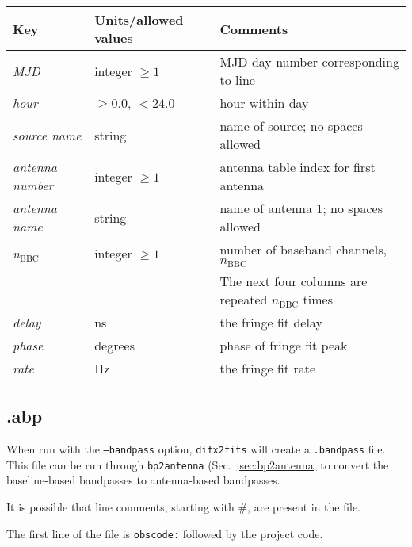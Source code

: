\begin{center}
\begin{tabular}{l l l}
\hline
Key & Units/allowed values & Comments \\
\hline
{\it MJD}            & integer $\ge 1$    & MJD day number corresponding to line \\
{\it hour}           & $\ge 0.0$, $< 24.0$ & hour within day \\
{\it source name}    & string             & name of source; no spaces allowed \\
{\it antenna number} & integer $\ge 1$    & antenna table index for first antenna \\
{\it antenna name}   & string             & name of antenna 1; no spaces allowed \\
{\it n}$_{\mathrm{BBC}}$  & integer $\ge 1$    & number of baseband channels, $n_{\mathrm{BBC}}$ \\
& & The next four columns are repeated $n_{\mathrm{BBC}}$ times \\
\hline
{\it delay}         & ns                 & the fringe fit delay \\
{\it phase}         & degrees            & phase of fringe fit peak \\
{\it rate}          & Hz                 & the fringe fit rate \\
\hline
\end{tabular}
\end{center}






\subsection{.abp} \label{sec:abp}

When run with the {\tt --bandpass} option, {\tt difx2fits} will create a {\tt .bandpass} file.
This file can be run through {\tt bp2antenna} (Sec.~\ref{sec:bp2antenna} to convert the baseline-based bandpasses to antenna-based bandpasses.

It is possible that line comments, starting with \#, are present in the file.

The first line of the file is {\tt obscode:} followed by the project code.

